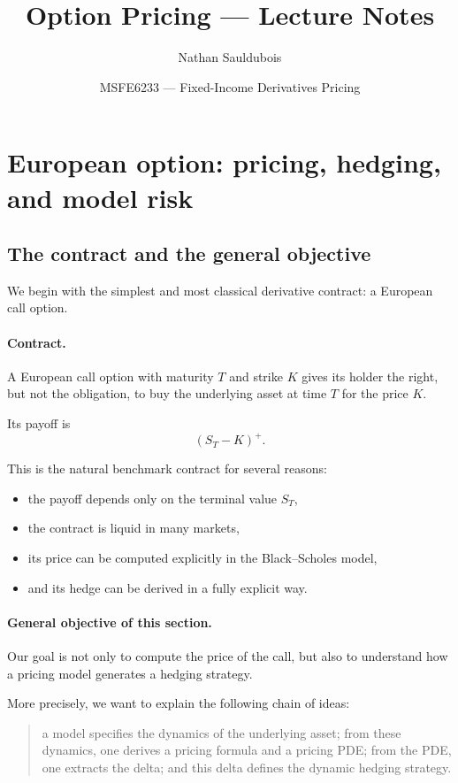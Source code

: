 \documentclass[11pt]{article}
\title{Option Pricing --- Lecture Notes}
\author{Nathan Sauldubois}
\date{MSFE6233 --- Fixed-Income Derivatives Pricing}
\theoremstyle{plain}
\theoremstyle{definition}
\theoremstyle{remark}
\begin{document}
\section{European option: pricing, hedging, and model risk}
\subsection{The contract and the general objective}

We begin with the simplest and most classical derivative contract: a
European call option.

\paragraph{Contract.}
A European call option with maturity \(T\) and strike \(K\) gives its
holder the right, but not the obligation, to buy the underlying asset at
time \(T\) for the price \(K\).

Its payoff is
\[
(S_T-K)^+.
\]

This is the natural benchmark contract for several reasons:
\begin{itemize}[leftmargin=1.4em]
    \item the payoff depends only on the terminal value \(S_T\),
    \item the contract is liquid in many markets,
    \item its price can be computed explicitly in the Black--Scholes
    model,
    \item and its hedge can be derived in a fully explicit way.
\end{itemize}

\paragraph{General objective of this section.}
Our goal is not only to compute the price of the call, but also to
understand how a pricing model generates a hedging strategy.

More precisely, we want to explain the following chain of ideas:
\begin{quote}
a model specifies the dynamics of the underlying asset; from these
dynamics, one derives a pricing formula and a pricing PDE; from the PDE,
one extracts the delta; and this delta defines the dynamic hedging
strategy.
\end{quote}
\end{document}
